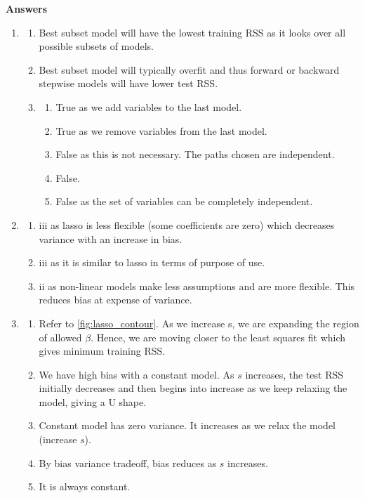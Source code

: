 \documentclass[11pt, a4paper]{article}
\begin{document}
    \textbf{Answers}
    \newline
    \begin{enumerate}
        \item
        \begin{enumerate}
            \item Best subset model will have the lowest training RSS as it looks over all possible subsets of models.
            \item Best subset model will typically overfit and thus forward or backward stepwise models will have lower test RSS.
            \item
            \begin{enumerate}
                \item True as we add variables to the last model.
                \item True as we remove variables from the last model.
                \item False as this is not necessary. The paths chosen are independent.
                \item False.
                \item False as the set of variables can be completely independent.
            \end{enumerate}
        \end{enumerate}

        \item
        \begin{enumerate}
            \item iii as lasso is less flexible (some coefficients are zero) which decreases variance with an increase in bias.
            \item iii as it is similar to lasso in terms of purpose of use.
            \item ii as non-linear models make less assumptions and are more flexible. This reduces bias at expense of variance.
        \end{enumerate}
        
        \item
        \begin{enumerate}
            \item Refer to \ref{fig:lasso_contour}. As we increase s, we are expanding the region of allowed $\beta$. Hence, we are moving closer to the least squares fit which gives minimum training RSS.
            \item We have high bias with a constant model. As $s$ increases, the test RSS initially decreases and then begins into increase as we keep relaxing the model, giving a U shape.
            \item Constant model has zero variance. It increases as we relax the model (increase $s$).
            \item By bias variance tradeoff, bias reduces as $s$ increases.
            \item It is always constant.
        \end{enumerate}


\end{enumerate}
\end{document}
